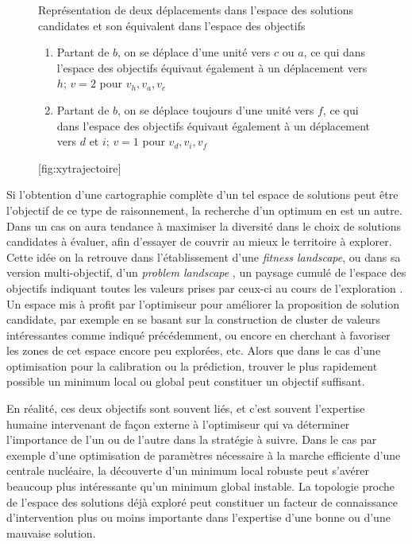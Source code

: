 \begin{figure}[!htbp]
	\begin{sidecaption}[fortoc]{Représentation de deux déplacements dans l'espace des solutions candidates et son équivalent dans l'espace des objectifs
	\parbox{\marginparwidth}{
	\begin{enumerate}[label=(\alph*),labelindent=\parindent,leftmargin=*]
	        \item Partant de $b$, on se déplace d'une unité vers $c$ ou $a$, ce qui dans l'espace des objectifs équivaut également à un déplacement vers $h$; $v=2$ pour $v_h, v_a, v_c$
	        \item Partant de $b$, on se déplace toujours d'une unité vers $f$, ce qui dans l'espace des objectifs équivaut également à un déplacement vers $d$ et $i$; $v=1$ pour $v_d,v_i,v_f$
	\end{enumerate}}}[fig:xytrajectoire]
	 \centering
	  \qquad
	\end{sidecaption}
\end{figure}

Si l'obtention d'une cartographie complète d'un tel espace de solutions peut être l'objectif de ce type de raisonnement, la recherche d'un optimum en est un autre. Dans un cas on aura tendance à maximiser la diversité dans le choix de solutions candidates à évaluer, afin d'essayer de couvrir au mieux le territoire à explorer. Cette idée on la retrouve dans l'établissement d'une \textit{fitness landscape}, ou dans sa version multi-objectif, d'un \textit{problem landscape} \autocite[93-94]{Weise2011}, un paysage cumulé de l'espace des objectifs indiquant toutes les valeurs prises par ceux-ci au cours de l'exploration . Un espace mis à profit par l'optimiseur pour améliorer la proposition de solution candidate, par exemple en se basant sur la construction de cluster de valeurs intéressantes comme indiqué précédemment, ou encore en cherchant à favoriser les zones de cet espace encore peu explorées, etc. Alors que dans le cas d'une optimisation pour la calibration ou la prédiction, trouver le plus rapidement possible un minimum local ou global peut constituer un objectif suffisant.

En réalité, ces deux objectifs sont souvent liés, et c'est souvent l'expertise humaine intervenant de façon externe à l'optimiseur qui va déterminer l'importance de l'un ou de l'autre dans la stratégie à suivre. Dans le cas par exemple d'une optimisation de paramètres nécessaire à la marche efficiente d'une centrale nucléaire, la découverte d'un minimum local robuste peut s'avérer beaucoup plus intéressante qu'un minimum global instable. La topologie proche de l'espace des solutions déjà exploré peut constituer un facteur de connaissance d'intervention plus ou moins importante dans l'expertise d'une bonne ou d'une mauvaise solution.

